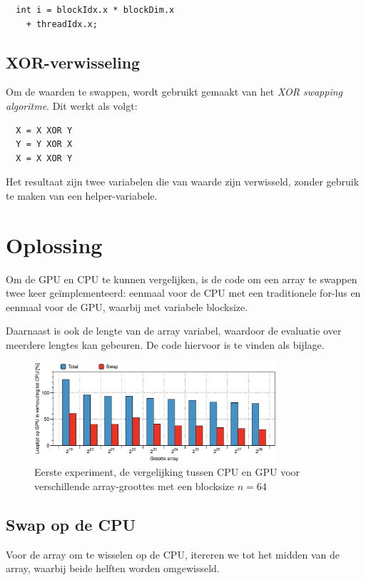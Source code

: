 \documentclass[twocolumn, a4paper]{article}
\begin{document}
\begin{verbatim}
  int i = blockIdx.x * blockDim.x 
    + threadIdx.x;
\end{verbatim}
\label{c:index}

\subsection{XOR-verwisseling}
Om de waarden te swappen, wordt gebruikt gemaakt van het \emph{XOR swapping algoritme}. Dit werkt als volgt:

\begin{verbatim}
  X = X XOR Y
  Y = Y XOR X
  X = X XOR Y
\end{verbatim}

Het resultaat zijn twee variabelen die van waarde zijn verwisseld, zonder gebruik te maken van een helper-variabele.

\section{Oplossing}
Om de GPU en CPU te kunnen vergelijken, is de code om een array te swappen twee keer ge\"implementeerd: eenmaal voor de CPU met een traditionele for-lus en eenmaal voor de GPU, waarbij met variabele blocksize.

Daarnaast is ook de lengte van de array variabel, waardoor de evaluatie over meerdere lengtes kan gebeuren. De code hiervoor is te vinden als bijlage.

\begin{figure}
  \centering
  \includegraphics[width=0.8\textwidth]{cpu_vs_gpu.eps}
  \caption{Eerste experiment, de vergelijking tussen CPU en GPU voor verschillende array-groottes met een blocksize $n=64$}
  \label{fig:b4_cpu_gpu}
\end{figure}

\subsection{Swap op de CPU}
Voor de array om te wisselen op de CPU, itereren we tot het midden van de array, waarbij beide helften worden omgewisseld.
\end{document}
